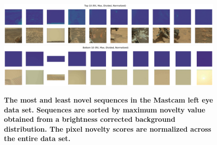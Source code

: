 \begin{figure}
\centering
\includegraphics[width=\linewidth]{figs/1/top10.jpg}
\includegraphics[width=\linewidth]{figs/1/bottom10.jpg}
\caption{\textbf{The most and least novel sequences in the Mastcam left eye data set. Sequences are sorted by maximum novelty value obtained from a brightness corrected background distribution. The pixel novelty scores  are normalized across the entire data set.}}
\label{chap1/fig:sorted}
\end{figure}

